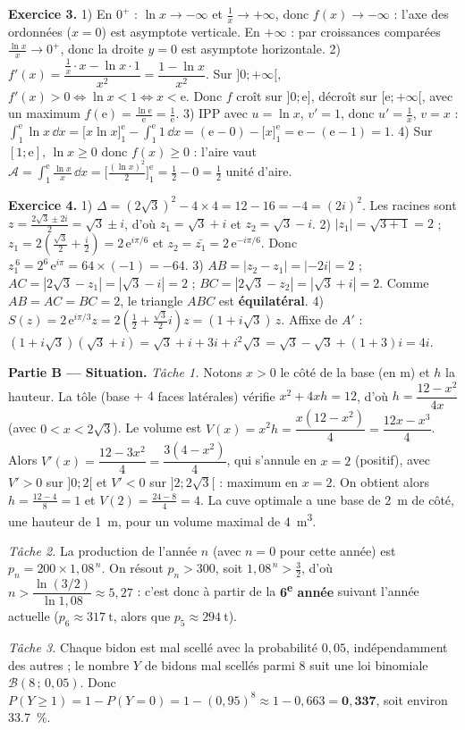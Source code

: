 \noindent\textbf{Exercice 3.}
1) En $0^+$ : $\ln x\to-\infty$ et $\frac1x\to+\infty$, donc $f(x)\to-\infty$ : l'axe des
ordonnées ($x=0$) est asymptote verticale. En $+\infty$ : par croissances comparées
$\frac{\ln x}{x}\to0^+$, donc la droite $y=0$ est asymptote horizontale.
2) $f'(x)=\dfrac{\frac1x\cdot x-\ln x\cdot1}{x^2}=\dfrac{1-\ln x}{x^2}$. Sur $]0;+\infty[$,
$f'(x)>0\iff\ln x<1\iff x<\mathrm{e}$. Donc $f$ croît sur $]0;\mathrm{e}]$, décroît sur
$[\mathrm{e};+\infty[$, avec un maximum $f(\mathrm{e})=\frac{\ln\mathrm{e}}{\mathrm{e}}=\frac1{\mathrm{e}}$.
3) IPP avec $u=\ln x$, $v'=1$, donc $u'=\frac1x$, $v=x$ :
$\int_1^{\mathrm{e}}\ln x\,\dd x=\big[x\ln x\big]_1^{\mathrm{e}}-\int_1^{\mathrm{e}}1\,\dd x
=(\mathrm{e}-0)-\big[x\big]_1^{\mathrm{e}}=\mathrm{e}-(\mathrm{e}-1)=1$.
4) Sur $[1;\mathrm{e}]$, $\ln x\ge0$ donc $f(x)\ge0$ : l'aire vaut
$\mathcal{A}=\int_1^{\mathrm{e}}\frac{\ln x}{x}\,\dd x=\Big[\frac{(\ln x)^2}{2}\Big]_1^{\mathrm{e}}
=\frac{1}{2}-0=\frac12$ unité d'aire.

\noindent\textbf{Exercice 4.}
1) $\Delta=(2\sqrt3)^2-4\times4=12-16=-4=(2i)^2$. Les racines sont
$z=\frac{2\sqrt3\pm2i}{2}=\sqrt3\pm i$, d'où $z_1=\sqrt3+i$ et $z_2=\sqrt3-i$.
2) $|z_1|=\sqrt{3+1}=2$ ; $z_1=2\!\left(\frac{\sqrt3}{2}+\frac i2\right)=2\,\mathrm{e}^{i\pi/6}$
et $z_2=\bar{z_1}=2\,\mathrm{e}^{-i\pi/6}$. Donc
$z_1^{\,6}=2^6\,\mathrm{e}^{i\pi}=64\times(-1)=-64$.
3) $AB=|z_2-z_1|=|-2i|=2$ ; $AC=|2\sqrt3-z_1|=|\sqrt3-i|=2$ ;
$BC=|2\sqrt3-z_2|=|\sqrt3+i|=2$. Comme $AB=AC=BC=2$, le triangle $ABC$ est \textbf{équilatéral}.
4) $S(z)=2\,\mathrm{e}^{i\pi/3}z=2\!\left(\frac12+\frac{\sqrt3}{2}i\right)z=(1+i\sqrt3)\,z$.
Affixe de $A'$ : $(1+i\sqrt3)(\sqrt3+i)=\sqrt3+i+3i+i^2\sqrt3=\sqrt3-\sqrt3+(1+3)i=4i$.

\smallskip
\noindent\textbf{Partie B — Situation.}
\emph{Tâche 1.} Notons $x>0$ le côté de la base (en m) et $h$ la hauteur. La tôle (base
$+$ $4$ faces latérales) vérifie $x^2+4xh=12$, d'où $h=\dfrac{12-x^2}{4x}$ (avec $0<x<2\sqrt3$).
Le volume est $V(x)=x^2h=\dfrac{x(12-x^2)}{4}=\dfrac{12x-x^3}{4}$. Alors
$V'(x)=\dfrac{12-3x^2}{4}=\dfrac{3(4-x^2)}{4}$, qui s'annule en $x=2$ (positif), avec
$V'>0$ sur $]0;2[$ et $V'<0$ sur $]2;2\sqrt3[$ : maximum en $x=2$. On obtient alors
$h=\frac{12-4}{8}=1$ et $V(2)=\frac{24-8}{4}=4$. La cuve optimale a une base de
\SI{2}{\metre} de côté, une hauteur de \SI{1}{\metre}, pour un volume maximal de \SI{4}{\metre\cubed}.

\emph{Tâche 2.} La production de l'année $n$ (avec $n=0$ pour cette année) est
$p_n=200\times1{,}08^{\,n}$. On résout $p_n>300$, soit $1{,}08^{\,n}>\frac32$, d'où
$n>\dfrac{\ln(3/2)}{\ln1{,}08}\approx5{,}27$ : c'est donc à partir de la \textbf{6\textsuperscript{e} année}
suivant l'année actuelle ($p_6\approx\SI{317}{\tonne}$, alors que $p_5\approx\SI{294}{\tonne}$).

\emph{Tâche 3.} Chaque bidon est mal scellé avec la probabilité $0{,}05$,
indépendamment des autres ; le nombre $Y$ de bidons mal scellés parmi $8$ suit une loi
binomiale $\mathcal{B}(8\,;\,0{,}05)$. Donc
$P(Y\ge1)=1-P(Y{=}0)=1-(0{,}95)^8\approx1-0{,}663=\mathbf{0{,}337}$, soit environ \SI{33,7}{\percent}.
